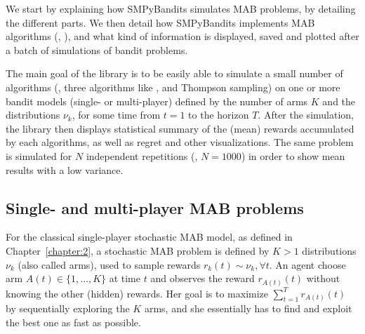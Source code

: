 
We start by explaining how SMPyBandits simulates MAB problems, by detailing the different parts.
We then detail how SMPyBandits implements MAB algorithms (\eg, \UCB),
and what kind of information is displayed, saved and plotted after a batch of simulations of bandit problems.

The main goal of the library is to be easily able to simulate a small number of algorithms (\eg, three algorithms like \UCB, \klUCB{} and Thompson sampling) on one or more bandit models (single- or multi-player) defined by the number of arms $K$ and the distributions $\nu_k$, for some time from $t=1$ to the horizon $T$.
After the simulation, the library then displays statistical summary of the (mean) rewards accumulated by each algorithms, as well as regret and other visualizations.
The same problem is simulated for $N$ independent repetitions (\eg, $N=1000$) in order to show mean results with a low variance.


\subsection{Single- and multi-player MAB problems}

For the classical single-player stochastic MAB model, as defined in Chapter~\ref{chapter:2},
a stochastic MAB problem is defined by $K>1$ distributions $\nu_k$ (also called arms),
used to sample \iid{} rewards $r_k(t) \sim \nu_k, \forall t$.
An agent choose arm $A(t)\in\{1,\dots,K\}$ at time $t$ and observes the reward $r_{A(t)}(t)$ without knowing the other (hidden) rewards.
Her goal is to maximize $\sum_{t=1}^T r_{A(t)}(t)$ by sequentially exploring the $K$ arms, and she essentially has to find and exploit the best one as fast as possible.

